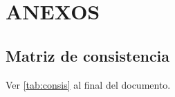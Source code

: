 \section{ANEXOS}\label{anexos}

\subsection{Matriz de consistencia}\label{matriz-de-consistencia}

Ver \autoref{tab:consis} al final del documento.


